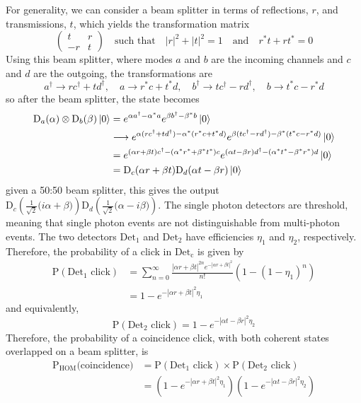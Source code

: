 For generality, we can consider a beam splitter in terms of reflections, $r$, and transmissions, $t$, which yields the transformation matrix
\begin{equation}
	\left(
	\begin{matrix}
		t & r \\
		-r & t
	\end{matrix}
	\right)
	\quad\text{such that}\quad
	|r|^2 + |t|^2 = 1 
	\quad\text{and}\quad
	r^\ast t + r t^\ast = 0
\end{equation}
Using this beam splitter, where modes $a$ and $b$ are the incoming channels and $c$ and $d$ are the outgoing, the transformations are
\begin{equation}
	a^\dagger \rightarrow rc^\dagger + td^\dagger, \quad a \rightarrow r^\ast c + t^\ast d, \quad b^\dagger \rightarrow tc^\dagger - rd^\dagger, \quad b \rightarrow t^\ast c - r^\ast d
\end{equation}
so after the beam splitter, the state becomes
\begin{align}
	\text{D}_a(\alpha)\otimes\text{D}_b(\beta)\ket{0} &=  e^{\alpha a^\dagger - \alpha^\ast a} e^{\beta b^\dagger - \beta^\ast b}\ket{0}\\
	&\longrightarrow  e^{\alpha (r c^\dagger + t d^\dagger) - \alpha^\ast (r^\ast c + t^\ast d)}e^{\beta (t c^\dagger - r d^\dagger) - \beta^\ast (t^\ast c - r^\ast d)}\ket{0}\\
	&=  e^{(\alpha r + \beta t) c^\dagger - (\alpha^\ast r^\ast + \beta^\ast t^\ast) c} e^{(\alpha t - \beta r) d^\dagger - (\alpha^\ast t^\ast - \beta^\ast r^\ast) d}\ket{0}\\
	&=  \text{D}_c(\alpha r + \beta t)\text{D}_d(\alpha t - \beta r)\ket{0}
\end{align}
given a 50:50 beam splitter, this gives the output $\text{D}_c(\frac{1}{\sqrt{2}}\big(i\alpha + \beta\big))\text{D}_d(\frac{1}{\sqrt{2}}\big(\alpha - i\beta\big))$. The single photon detectors are threshold, meaning that single photon events are not distinguishable from multi-photon events. The two detectors $\text{Det}_1$ and $\text{Det}_2$ have efficiencies $\eta_1$ and $\eta_2$, respectively. Therefore, the probability of a click in $\text{Det}_\text{c}$ is given by
\begin{align}
	\text{P}(\text{Det}_1 \text{ click}) &= \sum_{n=0}^\infty \frac{|\alpha r + \beta t|^{2n} e^{-|\alpha r + \beta t|^2}}{n!}(1-(1-\eta_1)^n)\\
	&= 1 - e^{-|\alpha r + \beta t|^2 \eta_1}
\end{align}
and equivalently,
\begin{equation}
	\text{P}(\text{Det}_2 \text{ click}) = 1 - e^{-|\alpha t - \beta r|^2 \eta_2}
\end{equation}
Therefore, the probability of a coincidence click, with both coherent states overlapped on a beam splitter, is
\begin{align}
	\text{P}_\text{HOM}\text{(coincidence)} &= \text{P}(\text{Det}_1 \text{ click}) \times \text{P}(\text{Det}_2 \text{ click})\\
	&= \left(1 - e^{-|\alpha r + \beta t|^2 \eta_1}\right)\left(1 - e^{-|\alpha t - \beta r|^2 \eta_2}\right)
\end{align}

